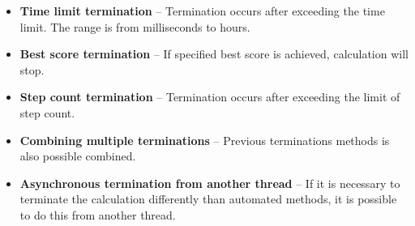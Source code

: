 \begin{itemize}
\item \textbf{Time limit termination} -- Termination occurs after exceeding the time limit. The range is from milliseconds to hours. 
\item \textbf{Best score termination} -- If specified best score is achieved, calculation will stop.
\item \textbf{Step count termination} -- Termination occurs after exceeding the limit of step count.
\item \textbf{Combining multiple terminations} -- Previous terminations methods is also possible combined.
\item \textbf{Asynchronous termination from another thread} -- If it is necessary to terminate the calculation differently than automated methods, it is possible to do this from another thread.
\end{itemize}


